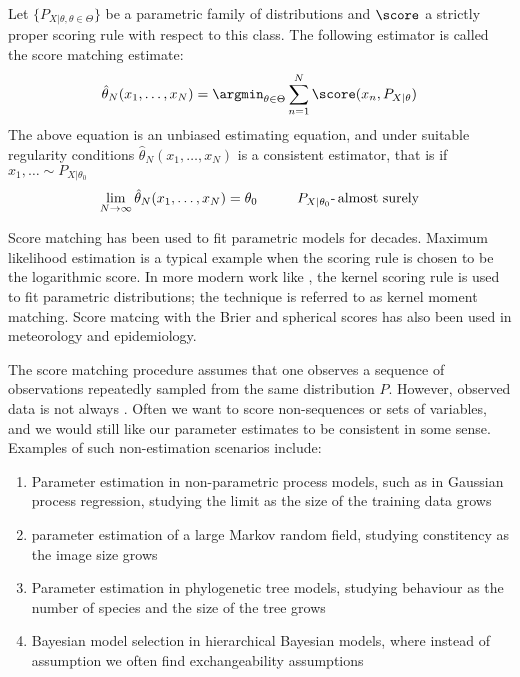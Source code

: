 \begin{definition}
Let $\{P_{X\vert\theta, \theta\in\Theta}\}$ be a parametric family of distributions and $\score$ a strictly proper scoring rule with respect to this class. The following estimator is called the score matching estimate:
\begin{equation}
	\hat{\theta}_N(x_1,\ldots,x_N) = \argmin_{\theta\in\Theta} \sum_{n=1}^{N}\score(x_n,P_{X\vert\theta}) \label{eqn:score_matching}
\end{equation}
The above equation is an unbiased estimating equation, and under suitable regularity conditions $\hat{\theta}_N(x_1,\ldots,x_N)$ is a consistent estimator, that is if $x_1,\ldots\sim P_{X\vert\theta_0}$\iid
\begin{equation}
	\lim_{N \rightarrow \infty} \hat{\theta}_N(x_1,\ldots,x_N) = \theta_0\hspace{1cm} P_{X\vert\theta_0}\mbox{-\,almost surely}
\end{equation}
\end{definition}

Score matching has been used to fit parametric models for decades. Maximum likelihood estimation is a typical example when the scoring rule is chosen to be the logarithmic score. In more modern work like \citep{kernelmomentmatching}, the kernel scoring rule is used to fit parametric distributions; the technique is referred to as kernel moment matching. Score matcing with the Brier and spherical scores has also been used in meteorology and epidemiology.

The score matching procedure assumes that one observes a sequence of \iid observations repeatedly sampled from the same distribution $P$. However, observed data is not always \iid. Often we want to score non-\iid sequences or sets of variables, and we would still like our parameter estimates to be consistent in some sense. Examples of such non-\iid estimation scenarios include:
\begin{enumerate}
	\item Parameter estimation in non-parametric process models, such as in Gaussian process regression, studying the limit as the size of the training data grows
	\item parameter estimation of a large Markov random field, studying constitency as the image size grows
	\item Parameter estimation in phylogenetic tree models, studying behaviour as the number of species and the size of the tree grows
	\item Bayesian model selection in hierarchical Bayesian models, where instead of \iid assumption we often find exchangeability assumptions
\end{enumerate}

